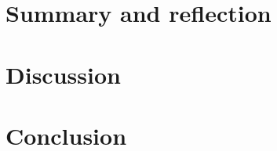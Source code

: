 


\section{Summary and reflection}
\label{chapter5-summary-and-reflection}

\section{Discussion}
\label{chapter5-discussion}

\section{Conclusion}
\label{chapter5-conclusion}

